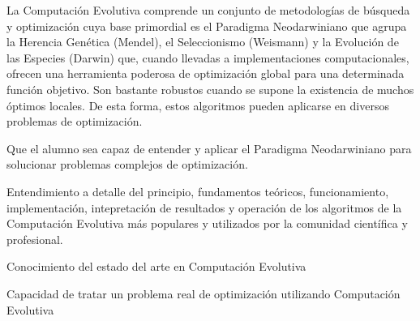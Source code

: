 \begin{syllabus}


\begin{justification}
    La Computación Evolutiva comprende un conjunto de metodologías de búsqueda y optimización cuya base primordial es el Paradigma Neodarwiniano que agrupa la Herencia Genética (Mendel), el Seleccionismo (Weismann) y la Evolución de las Especies (Darwin) que, cuando llevadas a implementaciones computacionales, ofrecen una herramienta poderosa de optimización global para una determinada función objetivo. Son bastante robustos cuando se supone la existencia de muchos óptimos locales. De esta forma, estos algoritmos pueden aplicarse en diversos problemas de optimización.
\end{justification}

\begin{goals}
\item Que el alumno sea capaz de entender y aplicar el Paradigma Neodarwiniano para solucionar problemas complejos de optimización.
\item Entendimiento a detalle del principio, fundamentos teóricos, funcionamiento, implementación, intepretación de resultados y operación de los algoritmos de la Computación Evolutiva más populares y utilizados por la comunidad científica y profesional.
\item Conocimiento del estado del arte en Computación Evolutiva
\item Capacidad de tratar un problema real de optimización utilizando Computación Evolutiva
\end{goals}

\begin{outcomes}
\end{outcomes}


\end{syllabus}
